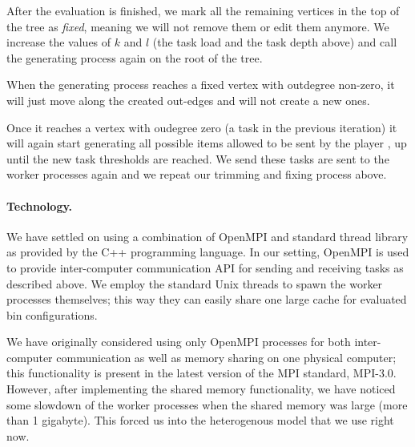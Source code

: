 After the evaluation is finished, we mark all the remaining vertices
in the top of the tree as \emph{fixed}, meaning we will not remove
them or edit them anymore. We increase the values of $k$ and $l$ (the
task load and the task depth above) and call the generating process
again on the root of the tree.

When the generating process reaches a fixed vertex with outdegree
non-zero, it will just move along the created out-edges and will not
create a new ones.

Once it reaches a vertex with oudegree zero (a task in the previous
iteration) it will again start generating all possible items allowed
to be sent by the player \adversary, up until the new task thresholds
are reached. We send these tasks are sent to the worker processes
again and we repeat our trimming and fixing process above.

\paragraph{Technology.} We have settled on using a combination of
OpenMPI \cite{openmpi} and standard thread library as provided by the
C++ programming language. In our setting, OpenMPI is used to provide
inter-computer communication API for sending and receiving tasks as
described above. We employ the standard Unix threads to spawn the
worker processes themselves; this way they can easily share one large
cache for evaluated bin configurations.

We have originally considered using only OpenMPI processes for both
inter-computer communication as well as memory sharing on one physical
computer; this functionality is present in the latest version of the
MPI standard, MPI-3.0. However, after implementing the shared memory
functionality, we have noticed some slowdown of the worker processes
when the shared memory was large (more than 1 gigabyte). This forced
us into the heterogenous model that we use right now.

